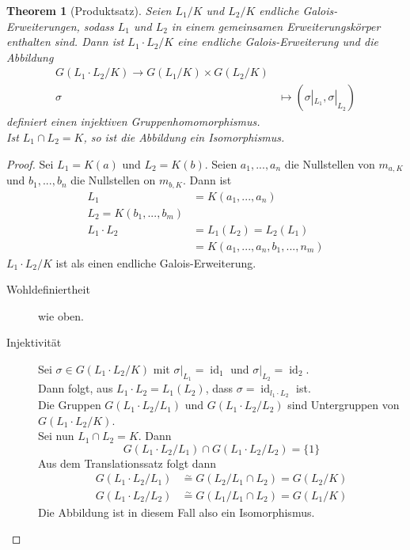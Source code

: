 \documentclass[10pt,a4paper]{article}
\newcommand{\id}{\operatorname{id}}
\newcommand{\isom}{\overset{\sim}{=}}
\theoremstyle{plain}
\newtheorem{theorem}{Theorem}[section]
\theoremstyle{definition}
\theoremstyle{remark}
\begin{document}
	\begin{theorem}[Produktsatz]
		Seien $L_1/K$ und $L_2/K$ endliche Galois-Erweiterungen, sodass $L_1$ und $L_2$ in einem gemeinsamen Erweiterungskörper enthalten sind. Dann ist ${L_1\cdot L_2}/K$ eine endliche Galois-Erweiterung und die Abbildung
		\begin{align*}
		G({L_1\cdot L_2}/K)\to G(L_1/K)\times G(L_2/K)\\
		\sigma&\mapsto(\sigma|_{L_1},\sigma|_{L_2})
		\end{align*}
		definiert einen injektiven Gruppenhomomorphismus.\\
		Ist $L_1\cap L_2=K$, so ist die Abbildung ein Isomorphismus.
	\end{theorem}
	\begin{proof}
		Sei $L_1=K(a)$ und $L_2=K(b)$. Seien $a_1,...,a_n$ die Nullstellen von $m_{a,K}$ und $b_1,...,b_n$ die Nullstellen on $m_{b,K}$. Dann ist
		\begin{align*}
		L_1&=K(a_1,...,a_n)\\
		L_2=K(b_1,...,b_m)\\
		L_1\cdot L_2&=L_1(L_2)=L_2(L_1)\\
		&=K(a_1,...,a_n,b_1,...,n_m)
		\end{align*}
		${L_1\cdot L_2}/K$ ist als einen endliche Galois-Erweiterung.\\
		\begin{description}
			\item[Wohldefiniertheit] wie oben.
			\item[Injektivität] Sei $\sigma\in G({L_1\cdot L_2}/K)$ mit $\sigma|_{L_1}=\id_1$ und $\sigma|_{L_2}=\id_2$.\\
			Dann folgt, aus $L_1\cdot L_2=L_1(L_2)$, dass $\sigma=\id_{l_1\cdot L_2}$ ist.\\
			Die Gruppen $G({L_1\cdot L_2}/L_1)$ und $G({L_1\cdot L_2}/L_2)$ sind Untergruppen von $G({L_1\cdot L_2}/K)$.\\
			Sei nun $L_1\cap L_2=K$. Dann
			\[G({L_1\cdot L_2}/L_1)\cap G({L_1\cdot L_2}/L_2)=\{1\}\]
			Aus dem Translationssatz folgt dann
			\begin{align*}
			G({L_1\cdot L_2}/L_1)&\isom G(L_2/{L_1\cap L_2}) = G(L_2/K)\\
			G({L_1\cdot L_2}/L_2)&\isom G(L_1/{L_1\cap L_2}) = G(L_1/K)
			\end{align*}
			Die Abbildung ist in diesem Fall also ein Isomorphismus.
		\end{description}
	\end{proof}
\end{document}
